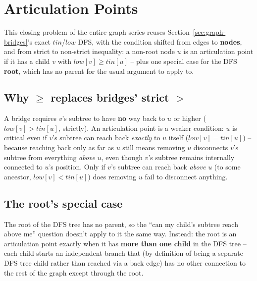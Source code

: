 \section{Articulation Points}
\label{sec:graph-articulation-points}


\begin{patternbox}
This closing problem of the entire graph series reuses
Section~\ref{sec:graph-bridges}'s exact $\textit{tin}$/$\textit{low}$
DFS, with the condition shifted from edges to \textbf{nodes}, and from
strict to non-strict inequality: a non-root node $u$ is an
articulation point if it has a child $v$ with
$\textit{low}[v] \ge \textit{tin}[u]$ -- plus one special case for the
DFS \textbf{root}, which has no parent for the usual argument to apply
to.
\end{patternbox}

\subsection*{Why $\ge$ replaces bridges' strict $>$}

A bridge requires $v$'s subtree to have \textbf{no} way back to $u$ or
higher ($\textit{low}[v] > \textit{tin}[u]$, strictly). An articulation
point is a weaker condition: $u$ is critical even if $v$'s subtree can
reach back \emph{exactly} to $u$ itself ($\textit{low}[v] =
\textit{tin}[u]$) -- because reaching back only as far as $u$ still
means removing $u$ disconnects $v$'s subtree from everything
\emph{above} $u$, even though $v$'s subtree remains internally
connected to $u$'s position. Only if $v$'s subtree can reach back
\emph{above} $u$ (to some ancestor, $\textit{low}[v] < \textit{tin}[u]$)
does removing $u$ fail to disconnect anything.

\subsection*{The root's special case}

The root of the DFS tree has no parent, so the ``can my child's
subtree reach above me'' question doesn't apply to it the same way.
Instead: the root is an articulation point exactly when it has
\textbf{more than one child} in the DFS tree -- each child starts an
independent branch that (by definition of being a separate DFS tree
child rather than reached via a back edge) has no other connection to
the rest of the graph except through the root.

